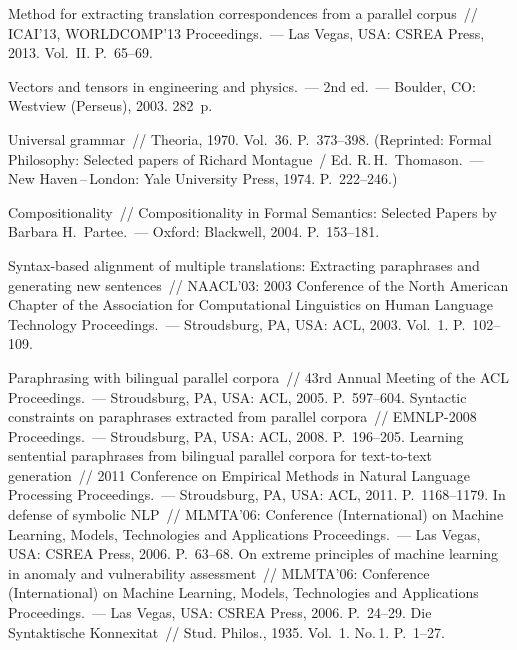 \begin{multicols}{2}
{{\begin{thebibliography}{99}
   Method for extracting translation correspondences from a parallel 
corpus~// ICAI'13, WORLDCOMP'13 Proceedings.~--- Las Vegas, USA: CSREA Press, 2013. 
Vol.~II. P.~65--69.


   Vectors and tensors in engineering and physics.~--- 2nd ed.~--- 
Boulder, CO: Westview (Perseus), 2003. 282~p.

   Universal grammar~// Theoria, 1970. Vol.~36. P.~373--398. (Reprinted: 
Formal Philosophy: Selected papers of Richard Montague~/ Ed. R.\,H.~Thomason.~--- New 
Haven\,--\,London: Yale University Press, 1974. P.~222--246.)

   Compositionality~// Compositionality in Formal Semantics: Selected Papers 
by Barbara H.~Partee.~--- Oxford: Blackwell, 2004. P.~153--181. 

   Syntax-based alignment of multiple translations: 
Extracting paraphrases and generating new sentences~// NAACL'03: 2003 Conference of the 
North American Chapter of the Association for Computational Linguistics on Human Language 
Technology Proceedings.~--- Stroudsburg, PA, USA: ACL, 2003. Vol.~1. P.~102--109.


   Paraphrasing with bilingual parallel corpora~// 43rd 
Annual Meeting of the ACL Proceedings.~--- Stroudsburg, PA, USA: 
ACL, 2005. P.~597--604.
   Syntactic constraints on paraphrases extracted from parallel 
corpora~// EMNLP-2008 Proceedings.~--- Stroudsburg, PA, USA: ACL, 2008. P.~196--205.
   Learning sentential 
paraphrases from bilingual parallel corpora for text-to-text generation~// 2011 Conference on 
Empirical Methods in Natural Language Processing Proceedings.~--- Stroudsburg, PA, USA: 
ACL, 2011. P.~1168--1179.
   In defense of symbolic NLP~// MLMTA'06: Conference (International) 
on Machine Learning, Models, Technologies and Applications Proceedings.~--- Las Vegas, 
USA: CSREA Press, 2006. P.~63--68.
   On extreme principles of machine learning in anomaly 
and vulnerability assessment~// MLMTA'06: Conference (International) on Machine Learning, 
Models, Technologies and Applications Proceedings.~--- Las Vegas, USA: CSREA Press, 2006. 
P.~24--29.
   Die Syntaktische Konnexitat~// Stud. Philos., 1935. Vol.~1. 
No.\,1. P.~1--27. 


\end{thebibliography}}}
\end{multicols}
